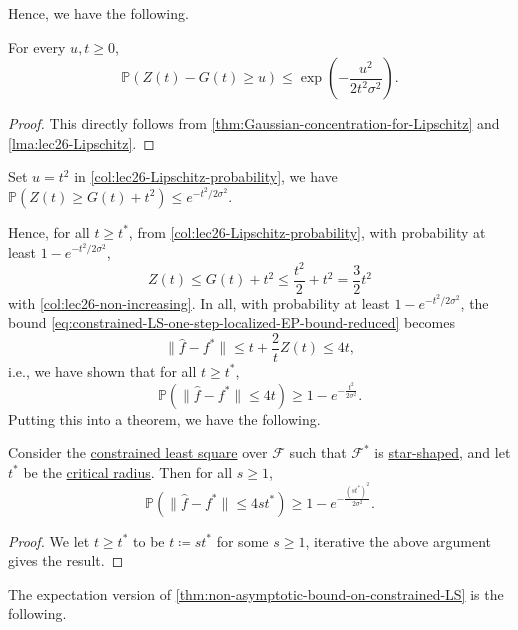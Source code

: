 Hence, we have the following.

\begin{corollary}\label{col:lec26-Lipschitz-probability}
	For every \(u, t \geq 0\),
	\[
		\mathbb{P} \left( Z(t) - G(t) \geq u \right) \leq \exp(- \frac{u^2}{2 t^2 \sigma ^2}).
	\]
\end{corollary}
\begin{proof}
	This directly follows from \autoref{thm:Gaussian-concentration-for-Lipschitz} and \autoref{lma:lec26-Lipschitz}.
\end{proof}

\begin{note}
	Set \(u = t^2\) in \autoref{col:lec26-Lipschitz-probability}, we have \(\mathbb{P} \left( Z(t) \geq G(t) + t^2 \right) \leq e^{- t^2 / 2 \sigma ^2}\).
\end{note}

Hence, for all \(t \geq t^{\ast} \), from \autoref{col:lec26-Lipschitz-probability}, with probability at least \(1 - e^{-t^2 / 2 \sigma ^2}\),
\[
	Z(t) \leq G(t) + t^2 \leq \frac{t^2}{2} + t^2 = \frac{3}{2}t^2
\]
with \autoref{col:lec26-non-increasing}. In all, with probability at least \(1 - e^{-t^2 / 2 \sigma ^2}\), the bound \autoref{eq:constrained-LS-one-step-localized-EP-bound-reduced} becomes
\[
	\lVert \hat{f} - f^{\ast} \rVert
	\leq t + \frac{2}{t} Z(t)
	\leq 4t,
\]
i.e., we have shown that for all \(t \geq t^{\ast} \),
\[
	\mathbb{P} \left( \lVert \hat{f} - f^{\ast} \rVert \leq 4t \right) \geq 1 - e^{-\frac{t^2}{2 \sigma ^2}}.
\]
Putting this into a theorem, we have the following.

\begin{theorem}\label{thm:non-asymptotic-bound-on-constrained-LS}
	Consider the \hyperref[prb:constrained-LS]{constrained least square} over \(\mathscr{F} \) such that \(\mathscr{F} ^{\ast} \) is \hyperref[def:star-shaped]{star-shaped}, and let \(t^{\ast} \) be the \hyperref[def:critical-radius]{critical radius}. Then for all \(s \geq 1\),
	\[
		\mathbb{P} \left( \lVert \hat{f} - f^{\ast} \rVert \leq 4 s t^{\ast} \right) \geq 1 - e^{-\frac{(s t^{\ast} )^2}{2 \sigma ^2}}.
	\]
\end{theorem}
\begin{proof}
	We let \(t \geq t^{\ast} \) to be \(t \coloneqq s t^{\ast} \) for some \(s \geq 1\), iterative the above argument gives the result.
\end{proof}

The expectation version of \autoref{thm:non-asymptotic-bound-on-constrained-LS} is the following.

